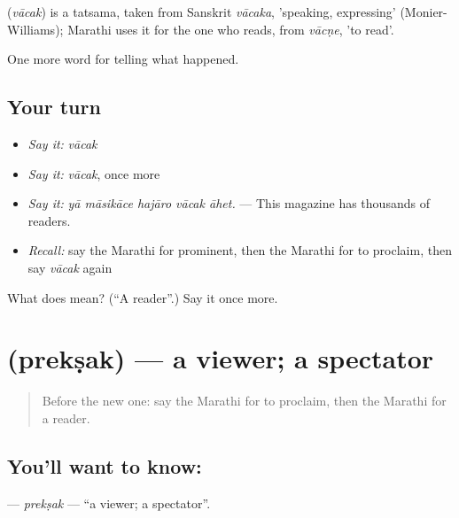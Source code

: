 \begin{cousinweb}
\textbf{} (\emph{vācak}) is a tatsama, taken from Sanskrit \emph{vācaka}, 'speaking, expressing' (Monier-Williams); Marathi uses it for the one who reads, from \emph{vācṇe}, 'to read'.
\end{cousinweb}

\begin{grammarlens}[title={What you've built}]
One more word for telling what happened.
\end{grammarlens}

\subsection*{Your turn}
\begin{itemize}
\raggedright
  \item \emph{Say it:} \emph{vācak}
  \item \emph{Say it:} \emph{vācak}, once more
  \item \emph{Say it:} \emph{yā māsikāce hajāro vācak āhet.} — This magazine has thousands of readers.
  \item \emph{Recall:} say the Marathi for prominent, then the Marathi for to proclaim, then say \emph{vācak} again
\end{itemize}

\begin{tcolorbox}[breakable,colback=teal!4,colframe=teal!35!black,title={Before you move on}]
What does  mean? (\textquotedblleft{}A reader\textquotedblright{}.) Say it once more.
\end{tcolorbox}
\section[\texorpdfstring{\mr{प्रेक्षक} (prekṣak)}{प्रेक्षक (prekṣak)}]{ (prekṣak) — a viewer; a spectator}

\label{lesson:MR-C314-preksak}



\begin{quote}
Before the new one: say the Marathi for to proclaim, then the Marathi for a reader.
\end{quote}

\subsection*{You'll want to know: }
\textbf{} — \emph{prekṣak} — \textquotedblleft{}a viewer; a spectator\textquotedblright{}.


